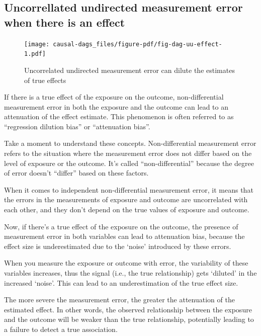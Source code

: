 \documentclass[
  singlecolumn]{report}
\begin{document}
\hypertarget{uncorrellated-undirected-measurement-error-when-there-is-an-effect}{%
\subsection{Uncorrellated undirected measurement error when there is an
effect}\label{uncorrellated-undirected-measurement-error-when-there-is-an-effect}}

\begin{figure}

{\centering \texttt{[image: causal-dags\_files/figure-pdf/fig-dag-uu-effect-1.pdf]}

}

\caption{\label{fig-dag-uu-effect}Uncorrelated undirected measurement
error can dilute the estimates of true effects}

\end{figure}

If there is a true effect of the exposure on the outcome,
non-differential measurement error in both the exposure and the outcome
can lead to an attenuation of the effect estimate. This phenomenon is
often referred to as ``regression dilution bias'' or ``attenuation
bias''.

Take a moment to understand these concepts. Non-differential measurement
error refers to the situation where the measurement error does not
differ based on the level of exposure or the outcome. It's called
``non-differential'' because the degree of error doesn't ``differ''
based on these factors.

When it comes to independent non-differential measurement error, it
means that the errors in the measurements of exposure and outcome are
uncorrelated with each other, and they don't depend on the true values
of exposure and outcome.

Now, if there's a true effect of the exposure on the outcome, the
presence of measurement error in both variables can lead to attenuation
bias, because the effect size is underestimated due to the `noise'
introduced by these errors.

When you measure the exposure or outcome with error, the variability of
these variables increases, thus the signal (i.e., the true relationship)
gets `diluted' in the increased `noise'. This can lead to an
underestimation of the true effect size.

The more severe the measurement error, the greater the attenuation of
the estimated effect. In other words, the observed relationship between
the exposure and the outcome will be weaker than the true relationship,
potentially leading to a failure to detect a true association.
\end{document}

